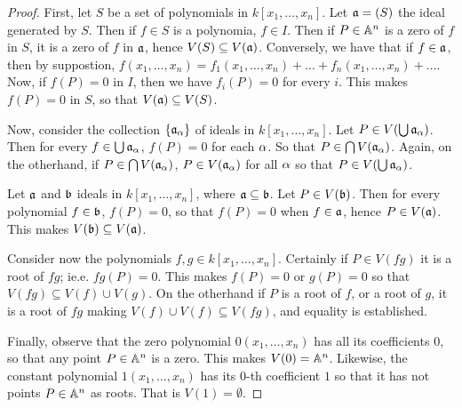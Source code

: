 \begin{proof}
    First, let $S$ be a set of polynomials in  $k[x_1, \dots, x_n]$. Let
    $\af=(S)$ the ideal generated by $S$. Then if  $f \in S$ is a polynomia,  $f
    \in I$. Then if $P \in \A^n$ is a zero of $f$ in $S$, it is a zero of $f$ in
     $\af$, hence  $V(S) \subseteq V(\af)$. Conversely, we have that if $f \in
     \af$, then by suppostion, $f(x_1, \dots, x_n)=f_1(x_1, \dots,
     x_n)+\dots+f_n(x_1, \dots, x_n)+\dots$. Now, if $f(P)=0$ in $I$, then we
     have $f_i(P)=0$ for every $i$. This makes $f(P)=0$ in $S$, so that  $V(\af)
     \subseteq V(S)$.

     Now, consider the collection $\{\af_\a\}$ of ideals in $k[x_1, \dots,
     x_n]$. Let $P \in V(\bigcup{\af_\a})$. Then for every $f \in
     \bigcup{\af_\a}$, $f(P)=0$ for each $\a$. So that $P \in
     \bigcap{V(\af_\a)}$. Again, on the otherhand, if $P \in
     \bigcap{V(\af_\a)}$, $P \in V(\af_\a)$ for all $\a$ so that  $P \in
     V(\bigcup{\af_\a})$.

     Let $\af$ and  $\bf$ ideals in  $k[x_1, \dots, x_n]$, where $\af \subseteq
     \bf$. Let $P \in V(\bf)$. Then for every polynomial $f \in \bf$, $f(P)=0$,
     so that $f(P)=0$ when $f \in \af$, hence  $P \in V(\af)$. This makes
     $V(\bf) \subseteq V(\af)$.

     Consider now the polynomials $f,g \in k[x_1, \dots, x_n]$. Certainly if $P
     \in V(fg)$ it is a root of $fg$; ie.e.  $fg(P)=0$. This makes $f(P)=0$ or
     $g(P)=0$ so that $V(fg) \subseteq V(f) \cup V(g)$. On the otherhand if $P$
     is a root of $f$, or a root of $g$, it is a root of  $fg$ making  $V(f)
     \cup V(f) \subseteq V(fg)$, and equality is established.

     Finally, observe that the zero polynomial $0(x_1, \dots, x_n)$ has all its
     coefficients $0$, so that any point $P \in \A^n$ is a zero. This makes
     $V(0)=\A^n$. Likewise, the constant polynomial $1(x_1, \dots, x_n)$ has its
     $0$-th coefficient $1$ so that it has not points  $P \in \A^n$ as roots.
     That is  $V(1)=\emptyset$.
\end{proof}
